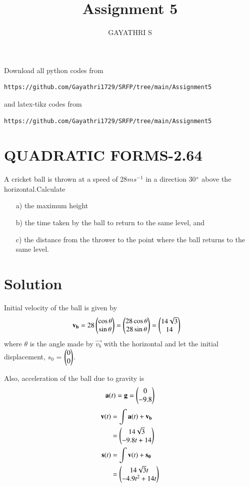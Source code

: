 \documentclass[journal,12pt,twocolumn]{IEEEtran}
\begin{document}
     \def\rightbox#1{\makebox[0in][r]{#1}}
     \def\centbox#1{\makebox[0in]{#1}}
     \def\topbox#1{\raisebox{-\baselineskip}[0in][0in]{#1}}
     \def\midbox#1{\raisebox{-0.5\baselineskip}[0in][0in]{#1}}
\vspace{3cm}
\title{Assignment 5}
\author{GAYATHRI S}
\maketitle
\newpage
\bigskip
\renewcommand{\thefigure}{\theenumi}
\renewcommand{\thetable}{\theenumi}
Download all python codes from 
\begin{lstlisting}
https://github.com/Gayathri1729/SRFP/tree/main/Assignment5
\end{lstlisting}
%
and latex-tikz codes from 
%
\begin{lstlisting}
https://github.com/Gayathri1729/SRFP/tree/main/Assignment5
\end{lstlisting}
%
\section{QUADRATIC FORMS-2.64}
A cricket ball is thrown at a speed of 28$ms^{-1}$ in a direction 30$\degree$ above the horizontal.Calculate
\begin{enumerate}
\item[a)]the maximum height
\item[b)]the time taken by the ball to return to the same level, and
\item[c)]the distance from the thrower to the point where the ball returns to the same level.
\end{enumerate}
%
\section{Solution}
%
Initial velocity of the ball is given by
\begin{align}
    \mathbf{v_b} &= 28\begin{pmatrix}\cos\theta \\ \sin\theta\end{pmatrix} =\begin{pmatrix}28\cos\theta \\ 28\sin\theta\end{pmatrix} =\begin{pmatrix}14\sqrt{3} \\ 14\end{pmatrix} 
\end{align}
where $\theta$ is the angle made by $\vec{v_b}$ with the horizontal and let the initial displacement, $s_0$ = $\begin{pmatrix}0\\0\end{pmatrix}$.

Also, acceleration of the ball due to gravity is 
\begin{equation}
    \mathbf{a}(t) = \mathbf{g} = \begin{pmatrix}0 \\ -9.8\end{pmatrix}
\end{equation}
\begin{align}
\mathbf{v}(t)&=\int{\mathbf{a}(t)} + \mathbf{v_b}    \\
          &=\begin{pmatrix}14\sqrt{3}\\-9.8t+14\end{pmatrix}\\
\mathbf{s}(t)&=\int{\mathbf{v}(t)} + \mathbf{s_0}    \\     
            &=\begin{pmatrix}14\sqrt{3}t\\-4.9{t^2}+14t\end{pmatrix}
\end{align}
\end{document}
